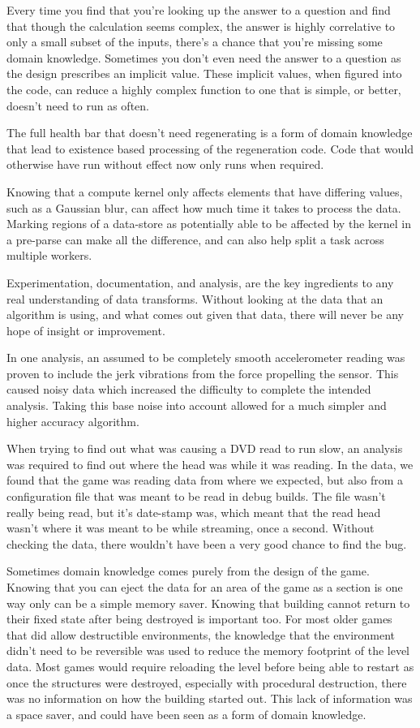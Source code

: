 Every time you find that you're looking up the answer to a question and find
that though the calculation seems complex, the answer is highly correlative to
only a small subset of the inputs, there's a chance that you're missing some
domain knowledge. Sometimes you don't even need the answer to a question as
the design prescribes an implicit value. These implicit values, when figured
into the code, can reduce a highly complex function to one that is simple, or
better, doesn't need to run as often.

The full health bar that doesn't need regenerating is a form of domain knowledge
that lead to existence based processing of the regeneration code. Code that would
otherwise have run without effect now only runs when required.

Knowing that a compute kernel only affects elements that have differing values,
such as a Gaussian blur, can affect how much time it takes to process the data.
Marking regions of a data-store as potentially able to be affected by the
kernel in a pre-parse can make all the difference, and can also help split a
task across multiple workers.

Experimentation, documentation, and analysis, are the key ingredients to any
real understanding of data transforms. Without looking at the data that an
algorithm is using, and what comes out given that data, there will never be
any hope of insight or improvement.

In one analysis, an assumed to be completely smooth accelerometer reading was
proven to include the jerk vibrations from the force propelling the sensor.
This caused noisy data which increased the difficulty to complete the intended
analysis. Taking this base noise into account allowed for a much simpler and
higher accuracy algorithm.

When trying to find out what was causing a DVD read to run slow, an analysis
was required to find out where the head was while it was reading. In the data,
we found that the game was reading data from where we expected, but also from a
configuration file that was meant to be read in debug builds. The file wasn't
really being read, but it's date-stamp was, which meant that the read head
wasn't where it was meant to be while streaming, once a second. Without
checking the data, there wouldn't have been a very good chance to find the bug.

Sometimes domain knowledge comes purely from the design of the game. Knowing
that you can eject the data for an area of the game as a section is one way
only can be a simple memory saver. Knowing that building cannot return to their
fixed state after being destroyed is important too. For most older games that
did allow destructible environments, the knowledge that the environment didn't
need to be reversible was used to reduce the memory footprint of the level
data.  Most games would require reloading the level before being able to
restart as once the structures were destroyed, especially with procedural
destruction, there was no information on how the building started out. This
lack of information was a space saver, and could have been seen as a form of
domain knowledge.

